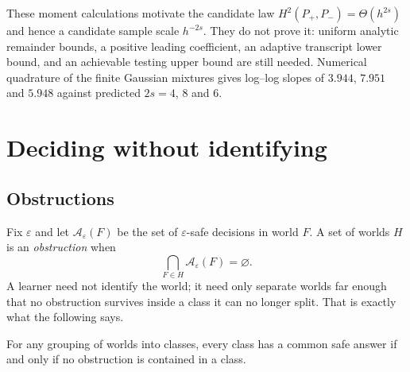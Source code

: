 These moment calculations motivate the candidate law
$H^2(P_+,P_-)=\Theta(h^{2s})$ and hence a candidate sample scale $h^{-2s}$.
They do not prove it: uniform analytic remainder bounds, a positive leading coefficient,
an adaptive transcript lower bound, and an achievable testing upper bound are still needed.
Numerical quadrature of the finite Gaussian mixtures gives log--log slopes of
$3.944$, $7.951$ and $5.948$ against predicted $2s=4$, $8$ and $6$. \NUM{}


\section{Deciding without identifying}
\label{sec:obstruction}

\subsection{Obstructions}

Fix $\varepsilon$ and let $\mathcal{A}_{\varepsilon}(F)$ be the set of $\varepsilon$-safe
decisions in world $F$. A set of worlds $H$ is an \emph{obstruction} when
\begin{equation}
\bigcap_{F\in H}\mathcal{A}_{\varepsilon}(F)=\varnothing .
\label{eq:obstruction}
\end{equation}
A learner need not identify the world; it need only separate worlds far enough that no
obstruction survives inside a class it can no longer split. That is exactly what the
following says.

\begin{theorem}
\label{thm:classes}
For any grouping of worlds into classes, every class has a common safe answer if and only
if no obstruction is contained in a class.
\end{theorem}

